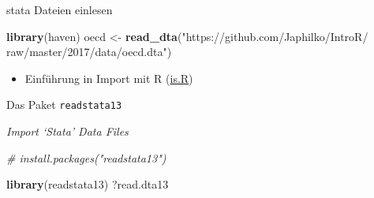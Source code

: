 \documentclass[ignorenonframetext,]{beamer}
\newenvironment{Shaded}{}{}
\newcommand{\KeywordTok}[1]{\textcolor[rgb]{0.00,0.44,0.13}{\textbf{{#1}}}}
\newcommand{\StringTok}[1]{\textcolor[rgb]{0.25,0.44,0.63}{{#1}}}
\newcommand{\CommentTok}[1]{\textcolor[rgb]{0.38,0.63,0.69}{\textit{{#1}}}}
\newcommand{\NormalTok}[1]{{#1}}
\providecommand{\tightlist}{%
\setlength{\itemsep}{0pt}\setlength{\parskip}{0pt}}
\begin{document}
\begin{frame}[fragile]{stata Dateien einlesen}

\begin{Shaded}
\begin{Highlighting}[]
\KeywordTok{library}\NormalTok{(haven)}
\NormalTok{oecd <-}\StringTok{ }\KeywordTok{read_dta}\NormalTok{(}\StringTok{"https://github.com/Japhilko/IntroR/}
\StringTok{                 raw/master/2017/data/oecd.dta"}\NormalTok{)}
\end{Highlighting}
\end{Shaded}

\begin{itemize}
\tightlist
\item
  Einführung in Import mit R
  (\href{http://is-r.tumblr.com/post/37181850668/reading-writing-stata-dta-files-with-foreign}{is.R})
\end{itemize}

\end{frame}

\begin{frame}[fragile]{Das Paket \texttt{readstata13}}

\begin{block}{\emph{Import `Stata' Data Files}}

\begin{Shaded}
\begin{Highlighting}[]
\CommentTok{# install.packages("readstata13")}
\end{Highlighting}
\end{Shaded}

\begin{Shaded}
\begin{Highlighting}[]
\KeywordTok{library}\NormalTok{(readstata13)}
\NormalTok{?read.dta13}
\end{Highlighting}
\end{Shaded}

\end{block}

\end{frame}
\end{document}
